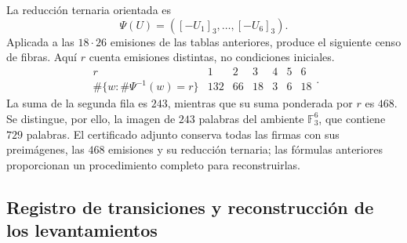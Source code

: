 La reducción ternaria orientada es
\[
 \Psi(U)=([-U_1]_3,\ldots,[-U_6]_3).
\]
Aplicada a las $18\cdot26$ emisiones de las tablas anteriores,
produce el siguiente censo de fibras. Aquí $r$ cuenta emisiones
distintas, no condiciones iniciales.
\begin{equation}
 \begin{array}{c|rrrrrr}
 r&1&2&3&4&5&6\\ \hline
 \#\{w:\#\Psi^{-1}(w)=r\}&132&66&18&3&6&18
 \end{array}.
 \label{iii:iii:nf-censo-ternario}
\end{equation}
La suma de la segunda fila es $243$, mientras que su suma ponderada
por $r$ es $468$. Se distingue, por ello, la imagen de $243$ palabras
del ambiente $\mathbb F_3^6$, que contiene $729$ palabras. El certificado
adjunto conserva todas las firmas con sus preimágenes, las $468$
emisiones y su reducción ternaria; las fórmulas anteriores proporcionan
un procedimiento completo para reconstruirlas.

\subsection{Registro de transiciones y reconstrucción de los levantamientos}

